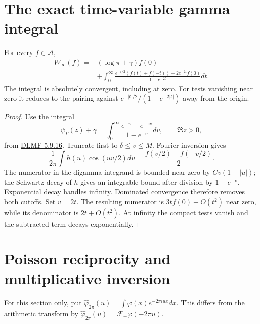 \section{The exact time-variable gamma integral}
\begin{theorem}
\label{v4-arith:w7-i:prop:dual-kernel}
For every $f\in\mathscr A$,
\[
 \begin{split}
 W_\infty(f)={}&(\log\pi+\gamma)f(0)\\
 &+\int_0^\infty
 \frac{e^{-t/2}(f(t)+f(-t))-2e^{-2t}f(0)}{1-e^{-2t}}dt.
 \end{split}
\]
The integral is absolutely convergent, including at zero.
For tests vanishing near zero it reduces to the pairing against
$e^{-|t|/2}/(1-e^{-2|t|})$ away from the origin.
\end{theorem}
\begin{proof}
Use the integral
\[
 \psi_\Gamma(z)+\gamma
 =\int_0^\infty\frac{e^{-v}-e^{-zv}}{1-e^{-v}}dv,
 \qquad\Re z>0,
\]
from \href{https://dlmf.nist.gov/5.9.E16}{DLMF 5.9.16}.
Truncate first to $\delta\le v\le M$. Fourier inversion gives
\[
 \frac1{2\pi}\int h(u)\cos(uv/2)du
 =\frac{f(v/2)+f(-v/2)}2.
\]
The numerator in the digamma integrand is bounded near zero by
$Cv(1+|u|)$; the Schwartz decay of $h$ gives an integrable bound
after division by $1-e^{-v}$. Exponential decay handles infinity.
Dominated convergence therefore removes both cutoffs.
Set $v=2t$. The resulting numerator is $3tf(0)+O(t^2)$ near zero,
while its denominator is $2t+O(t^2)$. At infinity the compact tests
vanish and the subtracted term decays exponentially.
\end{proof}

\section{Poisson reciprocity and multiplicative inversion}
For this section only, put
$\widehat\varphi_{2\pi}(u)=\int\varphi(x)e^{-2\pi iux}dx$.
This differs from the arithmetic transform by
$\widehat\varphi_{2\pi}(u)=\mathcal F_+\varphi(-2\pi u)$.

